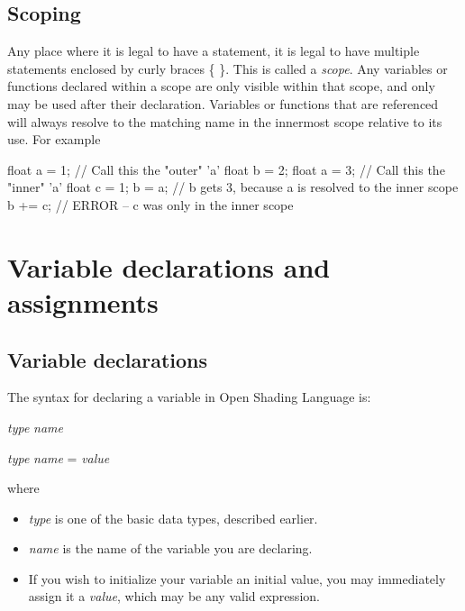 \documentclass[11pt,letterpaper]{book}
\def\langname{Open Shading Language\xspace}
\begin{document}
\subsection*{Scoping}

Any place where it is legal to have a statement, it is legal to have
multiple statements enclosed by curly braces {\cf \{ \}}.  This is
called a \emph{scope}.  Any variables or functions declared
within a scope are only visible within that scope, and only may be used
after their declaration.  Variables or functions that are referenced
will always resolve to the matching name in the innermost scope relative
to its use.  For example

\begin{code}
    float a = 1;      // Call this the "outer" 'a'
    float b = 2;
    {
        float a = 3;  // Call this the "inner" 'a'
        float c = 1;
        b = a;        // b gets 3, because a is resolved to the inner scope
    }
    b += c;           // ERROR -- c was only in the inner scope

\end{code}



\section{Variable declarations and assignments}
\label{sec:vardeclsassignments}

\subsection{Variable declarations}
\label{sec:vardecls}

The syntax for declaring a variable in \langname is:

\vspace{12pt}
\spc \emph{type} \emph{name} 

\spc \emph{type} \emph{name} = \emph{value}
\vspace{12pt}

\noindent where

\begin{itemize}
\item \emph{type} is one of the basic data types, described earlier.
\item \emph{name} is the name of the variable you are declaring.
\item If you wish to initialize your variable an initial value, you may
immediately assign it a \emph{value}, which may be any valid expression.
\end{itemize}
\end{document}
